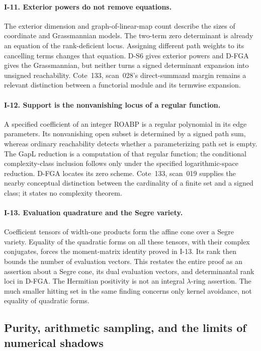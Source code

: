 \documentclass[11pt,a4paper]{article}
\theoremstyle{definition}\newtheorem{definition}{Definition}
\begin{document}
\paragraph{I-11. Exterior powers do not remove equations.}
The exterior dimension and graph-of-linear-map count describe the sizes of coordinate and Grassmannian models. The two-term zero determinant is already an equation of the rank-deficient locus. Assigning different path weights to its cancelling terms changes that equation. D-S6 gives exterior powers and D-FGA gives the Grassmannian, but neither turns a signed determinant expansion into unsigned reachability. Cote~133, scan~028's direct-summand margin remains a relevant distinction between a functorial module and its termwise expansion.

\paragraph{I-12. Support is the nonvanishing locus of a regular function.}
A specified coefficient of an integer ROABP is a regular polynomial in its edge parameters. Its nonvanishing open subset is determined by a signed path sum, whereas ordinary reachability detects whether a parameterizing path set is empty. The GapL reduction is a computation of that regular function; the conditional complexity-class inclusion follows only under the specified logarithmic-space reduction. D-FGA locates its zero scheme. Cote~133, scan~019 supplies the nearby conceptual distinction between the cardinality of a finite set and a signed class; it states no complexity theorem.

\paragraph{I-13. Evaluation quadrature and the Segre variety.}
Coefficient tensors of width-one products form the affine cone over a Segre variety. Equality of the quadratic forms on all these tensors, with their complex conjugates, forces the moment-matrix identity proved in I-13. Its rank then bounds the number of evaluation vectors. This restates the entire proof as an assertion about a Segre cone, its dual evaluation vectors, and determinantal rank loci in D-FGA. The Hermitian positivity is not an integral $\lambda$-ring assertion. The much smaller hitting set in the same finding concerns only kernel avoidance, not equality of quadratic forms.

\subsection{Purity, arithmetic sampling, and the limits of numerical shadows}
\end{document}
